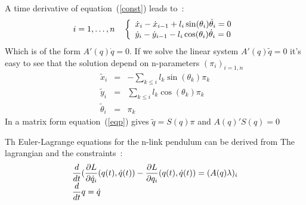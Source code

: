 \documentclass[11pt]{article}
\begin{document}
A time derivative of equation~(\ref{const}) leads to~:
\begin{equation}
	i=1,\ldots,n \quad \left\{
	\begin{array}{lcl}
	 \dot{x}_i -\dot{x}_{i-1} + l_i \sin(\theta_i)\dot{\theta}_i =0 \\
	 \dot{y}_i -\dot{y}_{i-1} - l_i \cos(\theta_i) \dot{\theta}_i =0 
	\end{array} \right.
\label{const}
\end{equation}
Which is of the form $A'(q) \dot{q} =0$.
If we solve the linear system $ A'(q)\tilde{q}=0 $ it's easy to see
that the solution depend on n-parameters $(\pi_i)_{i=1,n}$
\begin{eqnarray}
	\tilde{x}_i &=& - \sum_{k\le i} l_k \sin(\theta_k) \pi_k\\
	\tilde{y}_i &=&  \sum_{k\le i} l_k \cos(\theta_k) \pi_k\\
	\tilde{\theta}_i &=& \pi_k
\label{eqp}
\end{eqnarray}
In a  matrix form equation~(\ref{eqp}) gives $\tilde{q}=S(q)\pi$ and 
$ A(q)'S(q)=0$ 

Th Euler-Lagrange equations for the n-link pendulum can be derived
from The lagrangian and the constraints~:
\def\derivt{ {d \over dt}}
\def\derp#1#2{ { \partial #1 \over \partial #2}}
\begin{equation}
		\begin{array}{l} 
	\displaystyle \derivt ( \derp{L}{\dotq_i}(q(t),\dotq(t)) 
	- \derp{L}{q_i}(q(t),\dotq(t)) = (A(q)\lambda)_i \\
		\displaystyle \derivt q = \dotq
		\end{array}
\end{equation}
\end{document}
